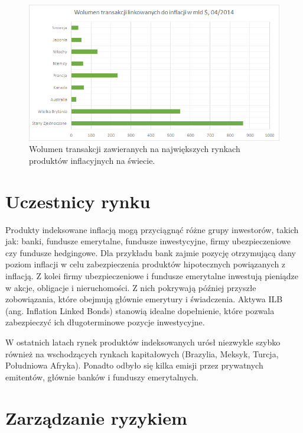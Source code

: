 \documentclass{mini}
\theoremstyle{mythstyle}
\begin{document}
	\begin{figure} [h]
		\centering
		\includegraphics[scale=0.8]{graphics/wolumen.png}
		\caption{Wolumen transakcji zawieranych na największych rynkach produktów inflacyjnych na świecie.}
	\end{figure}

	\section{Uczestnicy rynku}
		
	Produkty indeksowane inflacją mogą przyciągnąć różne grupy inwestorów, takich jak: banki, fundusze emerytalne, fundusze inwestycyjne, firmy ubezpieczeniowe czy fundusze hedgingowe. Dla przykładu bank zajmie pozycję otrzymującą dany poziom inflacji w celu zabezpieczenia produktów hipotecznych powiązanych z inflacją. Z kolei firmy ubezpieczeniowe i fundusze emerytalne inwestują pieniądze w akcje, obligacje i nieruchomości. Z nich pokrywają później przyszłe zobowiązania, które obejmują głównie emerytury i świadczenia. Aktywa ILB (ang. Inflation Linked Bonds) stanowią idealne dopełnienie, które pozwala zabezpieczyć ich długoterminowe pozycje inwestycyjne.

	W ostatnich latach rynek produktów indeksowanych urósł niezwykle szybko również na wschodzących rynkach kapitałowych (Brazylia, Meksyk, Turcja, Południowa Afryka). Ponadto odbyło się kilka emisji przez prywatnych emitentów, głównie banków i funduszy emerytalnych.

	\section{Zarządzanie ryzykiem}
	
\end{document}
